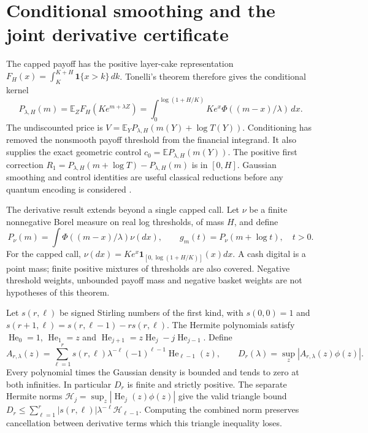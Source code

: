 \documentclass[11pt]{article}
\newcommand{\E}{\mathbb E}
\newcommand{\ind}{\mathbf 1}
\begin{document}
\section{Conditional smoothing and the joint derivative certificate}
\label{sec:norm}

The capped payoff has the positive layer-cake representation
$F_H(x)=\int_K^{K+H}\ind\{x>k\}\,dk$.
Tonelli's theorem therefore gives the conditional kernel
\begin{equation}
 P_{\lambda,H}(m)=\E_ZF_H(Ke^{m+\lambda Z})
 =\int_0^{\log(1+H/K)}Ke^x\Phi((m-x)/\lambda)\,dx.
 \label{eq:kernel}
\end{equation}
The undiscounted price is
$V=\E_Y P_{\lambda,H}(m(Y)+\log T(Y))$.
Conditioning has removed the nonsmooth payoff threshold from the financial
integrand.  It also supplies the exact geometric control
$c_0=\E P_{\lambda,H}(m(Y))$.
The positive first correction
$R_1=P_{\lambda,H}(m+\log T)-P_{\lambda,H}(m)$ is in $[0,H]$.
Gaussian smoothing and control identities are useful classical reductions
before any quantum encoding is considered \citep{curran,bayer}.

The derivative result extends beyond a single capped call.  Let $\nu$ be a
finite nonnegative Borel measure on real log thresholds, of mass $H$,
and define
\begin{equation}
 P_\nu(m)=\int\Phi((m-x)/\lambda)\nu(dx),\qquad
 g_m(t)=P_\nu(m+\log t),\quad t>0.
 \label{eq:measure-kernel}
\end{equation}
For the capped call,
$\nu(dx)=Ke^x\ind_{[0,\log(1+H/K)]}(x)dx$.
A cash digital is a point mass; finite positive mixtures of thresholds are
also covered.  Negative threshold weights, unbounded payoff mass and
negative basket weights are not hypotheses of this theorem.

Let $s(r,\ell)$ be signed Stirling numbers of the first kind, with
$s(0,0)=1$ and
$s(r+1,\ell)=s(r,\ell-1)-rs(r,\ell)$.
The Hermite polynomials satisfy
$\operatorname{He}_0=1$, $\operatorname{He}_1=z$ and
$\operatorname{He}_{j+1}=z\operatorname{He}_j-j\operatorname{He}_{j-1}$.
Define
\begin{equation}
 A_{r,\lambda}(z)=\sum_{\ell=1}^r s(r,\ell)\lambda^{-\ell}
 (-1)^{\ell-1}\operatorname{He}_{\ell-1}(z),\qquad
 D_r(\lambda)=\sup_z|A_{r,\lambda}(z)\phi(z)|.
 \label{eq:joint-norm}
\end{equation}
Every polynomial times the Gaussian density is bounded and tends to zero
at both infinities.  In particular $D_r$ is finite and strictly positive.
The separate Hermite norms
$\mathcal H_j=\sup_z|\operatorname{He}_j(z)\phi(z)|$ give the valid
triangle bound
$D_r\leq\sum_{\ell=1}^r|s(r,\ell)|\lambda^{-\ell}\mathcal H_{\ell-1}$.
Computing the combined norm preserves cancellation between derivative
terms which this triangle inequality loses.
\end{document}
